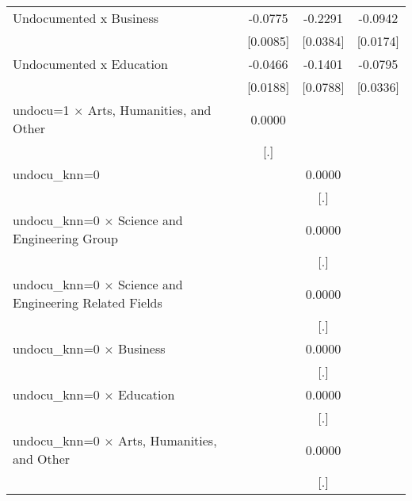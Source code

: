 \begin{table}[htbp]
\begin{tabular}{l*{3}{c}}
\addlinespace
Undocumented x Business&     -0.0775\sym{***}&     -0.2291\sym{***}&     -0.0942\sym{***}\\
                    &    [0.0085]         &    [0.0384]         &    [0.0174]         \\
\addlinespace
Undocumented x Education&     -0.0466\sym{**} &     -0.1401\sym{*}  &     -0.0795\sym{**} \\
                    &    [0.0188]         &    [0.0788]         &    [0.0336]         \\
\addlinespace
undocu=1 $\times$ Arts, Humanities, and Other&      0.0000         &                     &                     \\
                    &         [.]         &                     &                     \\
\addlinespace
undocu\_knn=0        &                     &      0.0000         &                     \\
                    &                     &         [.]         &                     \\
\addlinespace
undocu\_knn=0 $\times$ Science and Engineering Group&                     &      0.0000         &                     \\
                    &                     &         [.]         &                     \\
\addlinespace
undocu\_knn=0 $\times$ Science and Engineering Related Fields&                     &      0.0000         &                     \\
                    &                     &         [.]         &                     \\
\addlinespace
undocu\_knn=0 $\times$ Business&                     &      0.0000         &                     \\
                    &                     &         [.]         &                     \\
\addlinespace
undocu\_knn=0 $\times$ Education&                     &      0.0000         &                     \\
                    &                     &         [.]         &                     \\
\addlinespace
undocu\_knn=0 $\times$ Arts, Humanities, and Other&                     &      0.0000         &                     \\
                    &                     &         [.]         &                     \\

\end{tabular}
\end{table}
